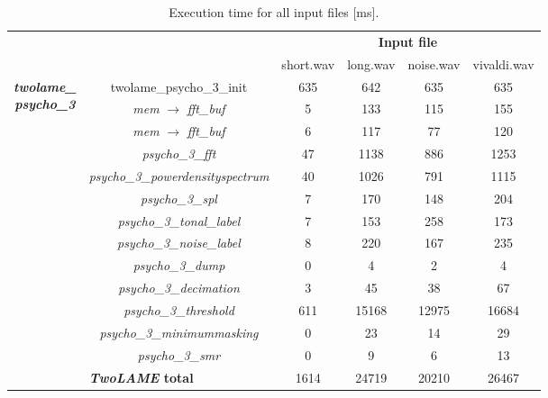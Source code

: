 \begin{table}[H]
    \centering
    \begin{tabular}{|c|c|c|c|c|c|}
    \cline{3-6}
    \multicolumn{2}{c|}{}  & \multicolumn{4}{c|}{\textbf{Input file}} \\
    \cline{3-6}
    \multicolumn{2}{c|}{} & short.wav & long.wav & noise.wav & vivaldi.wav \\
    \cline{1-6}
   \multirow{13}{*}{\parbox{2.3cm}{\centering \textbf{\textit{twolame\_} \\ \textit{psycho\_3}}}}  & \multicolumn{1}{c|}{twolame\_psycho\_3\_init}  & 635 & 642 & 635 & 635 \\ 
    \cline{2-6}
    & \multicolumn{1}{c|}{\textit{mem} $\rightarrow$ \textit{fft\_buf}} & 5 & 133 & 115 & 155 \\ 
    \cline{2-6}
    & \multicolumn{1}{c|}{\textit{mem} $\rightarrow$ \textit{fft\_buf}} &  6 &  117& 77 &  120 \\ 
    \cline{2-6}
    & \multicolumn{1}{c|}{\textit{psycho\_3\_fft}} & 47 & 1138 & 886 &  1253  \\ 
    \cline{2-6}
    & \multicolumn{1}{c|}{\textit{psycho\_3\_powerdensityspectrum}} & 40  & 1026 & 791 &  1115  \\ 
    \cline{2-6}
    & \multicolumn{1}{c|}{\textit{psycho\_3\_spl}} &  7 & 170 & 148 & 204  \\ 
    \cline{2-6}
     & \multicolumn{1}{c|}{\textit{psycho\_3\_tonal\_label}} &  7 & 153 & 258 & 173  \\ 
    \cline{2-6}
    & \multicolumn{1}{c|}{\textit{psycho\_3\_noise\_label}} & 8 & 220 & 167 & 235  \\ 
    \cline{2-6}
    & \multicolumn{1}{c|}{\textit{psycho\_3\_dump}} &  0 & 4 & 2 & 4  \\ 
    \cline{2-6}
    & \multicolumn{1}{c|}{\textit{psycho\_3\_decimation}} & 3 & 45 & 38 & 67   \\
    \cline{2-6}
    & \multicolumn{1}{c|}{\textit{psycho\_3\_threshold}} & 611 & 15168  & 12975 &  16684 \\
    \cline{2-6}
    & \multicolumn{1}{c|}{\textit{psycho\_3\_minimummasking}} & 0 & 23 & 14 & 29  \\ 
    \cline{2-6}
    & \multicolumn{1}{c|}{\textit{psycho\_3\_smr}} & 0 & 9 & 6 & 13  \\ 
    \hline
    \multicolumn{2}{|c|}{\textbf{\textit{TwoLAME} total}}  & 1614 & 24719 & 20210 & 26467 \\ 
    \hline
    \end{tabular}
    \caption{Execution time for all input files [ms].}
    \label{profiling3}
\end{table}

